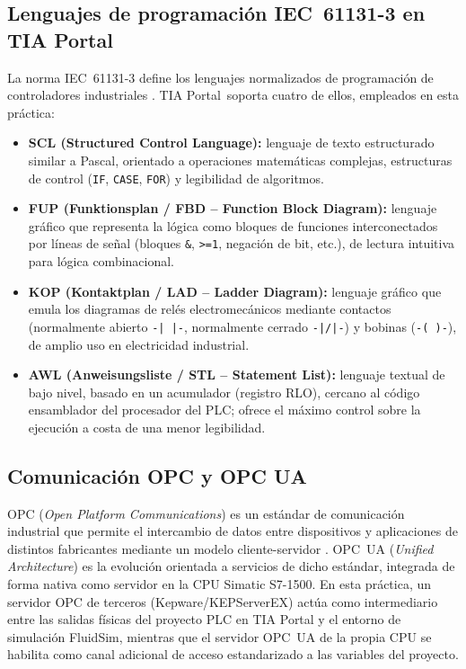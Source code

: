 \documentclass[conference]{IEEEtran}
\begin{document}
\subsection*{Lenguajes de programación IEC~61131-3 en TIA Portal}
La norma IEC~61131-3 define los lenguajes normalizados de programación de controladores industriales \cite{iec61131_3}. TIA Portal\textregistered\ soporta cuatro de ellos, empleados en esta práctica:

\begin{itemize}
    \item \textbf{SCL (Structured Control Language):} lenguaje de texto estructurado similar a Pascal, orientado a operaciones matemáticas complejas, estructuras de control (\texttt{IF}, \texttt{CASE}, \texttt{FOR}) y legibilidad de algoritmos.
    \item \textbf{FUP (Funktionsplan / FBD -- Function Block Diagram):} lenguaje gráfico que representa la lógica como bloques de funciones interconectados por líneas de señal (bloques \texttt{\&}, \texttt{>=1}, negación de bit, etc.), de lectura intuitiva para lógica combinacional.
    \item \textbf{KOP (Kontaktplan / LAD -- Ladder Diagram):} lenguaje gráfico que emula los diagramas de relés electromecánicos mediante contactos (normalmente abierto \texttt{-| |-}, normalmente cerrado \texttt{-|/|-}) y bobinas (\texttt{-( )-}), de amplio uso en electricidad industrial.
    \item \textbf{AWL (Anweisungsliste / STL -- Statement List):} lenguaje textual de bajo nivel, basado en un acumulador (registro RLO), cercano al código ensamblador del procesador del PLC; ofrece el máximo control sobre la ejecución a costa de una menor legibilidad.
\end{itemize}

\subsection*{Comunicación OPC y OPC UA}
OPC (\emph{Open Platform Communications}) es un estándar de comunicación industrial que permite el intercambio de datos entre dispositivos y aplicaciones de distintos fabricantes mediante un modelo cliente-servidor \cite{marshall_industrial_ethernet}. OPC~UA (\emph{Unified Architecture}) es la evolución orientada a servicios de dicho estándar, integrada de forma nativa como servidor en la CPU Simatic S7-1500. En esta práctica, un servidor OPC de terceros (Kepware/KEPServerEX) actúa como intermediario entre las salidas físicas del proyecto PLC en TIA Portal y el entorno de simulación FluidSim\textregistered, mientras que el servidor OPC~UA de la propia CPU se habilita como canal adicional de acceso estandarizado a las variables del proyecto.
\end{document}

